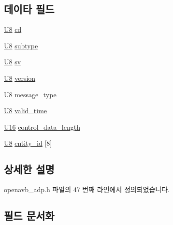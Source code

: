 \subsection*{데이타 필드}
\begin{DoxyCompactItemize}
\item 
\hyperlink{openavb__types__base__pub_8h_aa63ef7b996d5487ce35a5a66601f3e73}{U8} \hyperlink{structopenavb__adp__control__header__t_ad2828a59ad0b95e77da38333c0a717de}{cd}
\item 
\hyperlink{openavb__types__base__pub_8h_aa63ef7b996d5487ce35a5a66601f3e73}{U8} \hyperlink{structopenavb__adp__control__header__t_ad61c2796f8f447c2ca8979f4aeccf351}{subtype}
\item 
\hyperlink{openavb__types__base__pub_8h_aa63ef7b996d5487ce35a5a66601f3e73}{U8} \hyperlink{structopenavb__adp__control__header__t_adc62d14194c9ab3aff5b994caef8bcb0}{sv}
\item 
\hyperlink{openavb__types__base__pub_8h_aa63ef7b996d5487ce35a5a66601f3e73}{U8} \hyperlink{structopenavb__adp__control__header__t_ae5d1ca2d5099c6a5f760c897505cb11b}{version}
\item 
\hyperlink{openavb__types__base__pub_8h_aa63ef7b996d5487ce35a5a66601f3e73}{U8} \hyperlink{structopenavb__adp__control__header__t_a5e8953d77df4508aa07ed906c5b19beb}{message\+\_\+type}
\item 
\hyperlink{openavb__types__base__pub_8h_aa63ef7b996d5487ce35a5a66601f3e73}{U8} \hyperlink{structopenavb__adp__control__header__t_aebe5bad8aaf2356c644fc10e5c3f8fdf}{valid\+\_\+time}
\item 
\hyperlink{openavb__types__base__pub_8h_a0a0a322d5fa4a546d293a77ba8b4a71f}{U16} \hyperlink{structopenavb__adp__control__header__t_a6a26fcf01946013b206d67551ef6eb84}{control\+\_\+data\+\_\+length}
\item 
\hyperlink{openavb__types__base__pub_8h_aa63ef7b996d5487ce35a5a66601f3e73}{U8} \hyperlink{structopenavb__adp__control__header__t_ab748fb58fac21e84c356282323c9b9e2}{entity\+\_\+id} \mbox{[}8\mbox{]}
\end{DoxyCompactItemize}


\subsection{상세한 설명}


openavb\+\_\+adp.\+h 파일의 47 번째 라인에서 정의되었습니다.



\subsection{필드 문서화}
